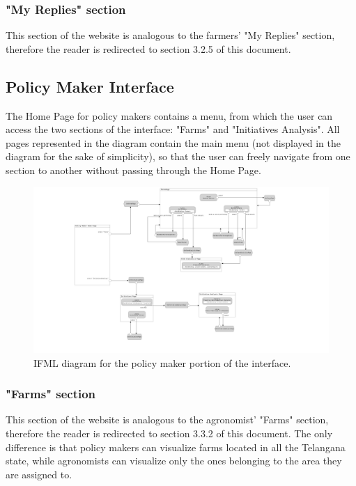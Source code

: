 \documentclass{article}
\begin{document}
\subsubsection{"My Replies" section}
This section of the website is analogous to the farmers' "My Replies" section, therefore the reader is redirected to section 3.2.5 of this document.

\subsection{Policy Maker Interface}
The Home Page for policy makers contains a menu, from which the user can access the two sections of the interface: "Farms" and "Initiatives Analysis".
All pages represented in the diagram contain the main menu (not displayed in the diagram for the sake of simplicity), so that the user can freely navigate from one section to another without passing through the Home Page. 
\begin{center}
    \begin{figure}
    \includegraphics[scale=0.11]{diagrams/ui diagrams/policymaker/policymaker.png}
    \caption{IFML diagram for the policy maker portion of the interface.}
\end{figure}
\end{center}
\newpage

\subsubsection{"Farms" section}
This section of the website is analogous to the agronomist' "Farms" section, therefore the reader is redirected to section 3.3.2 of this document.
The only difference is that policy makers can visualize farms located in all the Telangana state, while agronomists can visualize only the ones belonging to the area they are assigned to.
\end{document}
